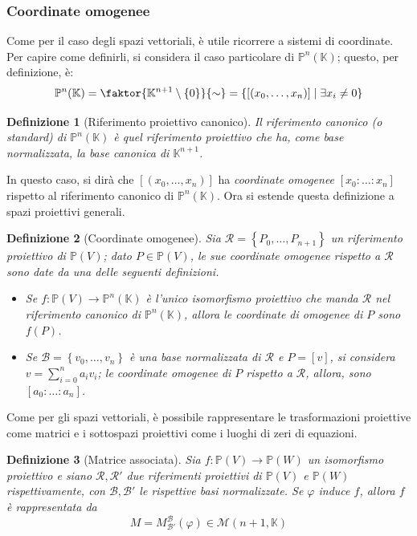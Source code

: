 \documentclass[11pt]{scrartcl}
\theoremstyle{style1}
\newtheorem{definizione}{Definizione}[section]
\numberwithin{equation}{subsection}
\begin{document}
\subsubsection{Coordinate omogenee}
Come per il caso degli spazi vettoriali, \`e utile ricorrere a sistemi di coordinate.
Per capire come definirli, si considera il caso particolare di $\mathbb{P}^n(\mathbb{K})$; questo, per definizione, \`e:
\[
	\mathbb{P}^n(\mathbb{K}) = \faktor{\mathbb{K}^{n+1} \setminus\left\{ 0 \right\} }{\sim} = \left\{ [(x_0,\ldots,x_n)]  \mid \exists x_i \neq 0 \right\} 
\] 
\begin{definizione}
	[Riferimento proiettivo canonico]
	Il \textit{riferimento canonico} (o standard) di $\mathbb{P}^n(\mathbb{K})$ \`e quel riferimento proiettivo che ha, come base normalizzata, la base canonica di $\mathbb{K}^{n+1} $.
\end{definizione}
\noindent In questo caso, si dir\`a che $[(x_0,\ldots,x_n)]$ ha \textit{coordinate omogenee} $[x_0:\ldots :x_n]$ rispetto al riferimento canonico di $\mathbb{P}^n(\mathbb{K})$.
Ora si estende questa definizione a spazi proiettivi generali.
\begin{definizione}
	[Coordinate omogenee]
	Sia $\mathcal{R} = \left\{ P_0,\ldots,P_{n+1}  \right\} $ un riferimento proiettivo di $\mathbb{P}(V)$; dato $P \in \mathbb{P}(V)$, le sue \textit{coordinate omogenee} rispetto a $\mathcal{R} $ sono date da una delle seguenti definizioni.
	\begin{itemize}
		\item Se $f:\mathbb{P}(V)\to \mathbb{P}^n(\mathbb{K})$ \`e l'unico isomorfismo proiettivo che manda $\mathcal{R} $ nel riferimento canonico di $\mathbb{P}^n(\mathbb{K})$, allora le coordinate di omogenee di $P$ sono $f(P)$.
		\item Se $\mathcal{B} = \left\{ v_0, \ldots ,v_n\right\} $ \`e una base normalizzata di $\mathcal{R} $ e $P = [v]$, si considera $v = \sum_{i=0}^{n} a_i v_i$; le coordinate omogenee di $P$ rispetto a $\mathcal{R}$, allora, sono $[a_0:\ldots:a_n]$.
	\end{itemize}
\end{definizione}
\noindent Come per gli spazi vettoriali, \`e possibile rappresentare le trasformazioni proiettive come matrici e i sottospazi proiettivi come i luoghi di zeri di equazioni.
\begin{definizione}
	[Matrice associata]
Sia $f:\mathbb{P}(V) \to \mathbb{P}(W)$ un isomorfismo proiettivo e siano $\mathcal{R} , \mathcal{R} '$ due riferimenti proiettivi di $\mathbb{P}(V)$ e $\mathbb{P}(W)$ rispettivamente, con $\mathcal{B} ,\mathcal{B} '$ le rispettive basi normalizzate.
Se $\varphi $ induce $f$, allora $f$ \`e rappresentata da 
\[
M = M_{\mathcal{B} '} ^{\mathcal{B} } (\varphi ) \in \mathcal{M} (n+1,\mathbb{K})
\] 
\end{definizione}
\end{document}
